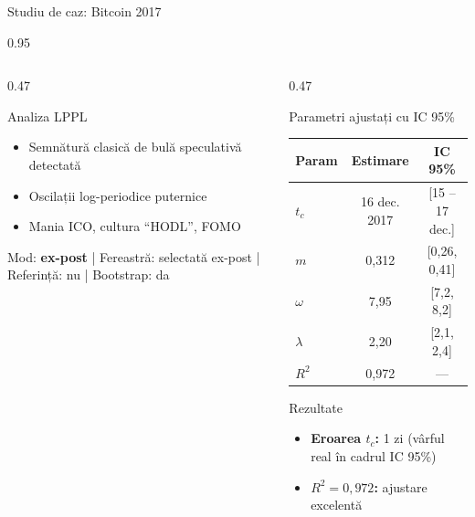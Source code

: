 \documentclass[9pt, aspectratio=169, t]{beamer}
\begin{document}
\begin{frame}{Studiu de caz: Bitcoin 2017}
\begin{cminipage}{0.95\textwidth}
{\begin{columns}[T]
\begin{column}{0.47\textwidth}
            \begin{exampleblock}{Analiza LPPL}
                \begin{itemize}\setlength{\itemsep}{0pt}
                    \item Semnătură clasică de bulă speculativă detectată
                    \item Oscilații log-periodice puternice
                    \item Mania ICO, cultura ``HODL'', FOMO
                \end{itemize}
            \end{exampleblock}
            \vspace{-2mm}
            {\scriptsize\textcolor{MediumGray}{Mod: \textbf{ex-post} | Fereastră: selectată ex-post | Referință: nu | Bootstrap: da}}
        \end{column}
        \begin{column}{0.47\textwidth}
            \begin{alertblock}{Parametri ajustați cu IC 95\%}
                \begin{center}
                    \begin{tabular}{lcc}
                        \toprule
                        \textbf{Param} & \textbf{Estimare} & \textbf{IC 95\%} \\
                        \midrule
                        $t_c$ & 16 dec. 2017 & [15 -- 17 dec.] \\
                        $m$ & 0,312 & [0,26, 0,41] \\
                        $\omega$ & 7,95 & [7,2, 8,2] \\
                        $\lambda$ & 2,20 & [2,1, 2,4] \\
                        $R^2$ & 0,972 & --- \\
                        \bottomrule
                    \end{tabular}
                \end{center}
            \end{alertblock}

            \begin{exampleblock}{Rezultate}
                \begin{itemize}\setlength{\itemsep}{0pt}
                    \item \textbf{Eroarea $t_c$:} 1 zi (vârful real în cadrul IC 95\%)
                    \item \textbf{$R^2 = 0{,}972$:} ajustare excelentă
                \end{itemize}
            \end{exampleblock}
        \end{column}
    \end{columns}
    }
    \end{cminipage}
\end{frame}
\end{document}
